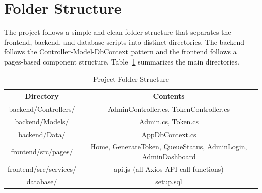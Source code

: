 \section{Folder Structure}

The project follows a simple and clean folder structure that separates the frontend, backend, and database scripts into distinct directories. The backend follows the Controller-Model-DbContext pattern and the frontend follows a pages-based component structure. Table~\ref{tab:folders} summarizes the main directories.

\begin{table}[htbp]
    \centering
    \begin{tabular}{|c|c|}
        \hline
        \textbf{Directory} & \textbf{Contents} \\
        \hline
        backend/Controllers/ & AdminController.cs, TokenController.cs \\
        \hline
        backend/Models/ & Admin.cs, Token.cs \\
        \hline
        backend/Data/ & AppDbContext.cs \\
        \hline
        frontend/src/pages/ & Home, GenerateToken, QueueStatus, AdminLogin, AdminDashboard \\
        \hline
        frontend/src/services/ & api.js (all Axios API call functions) \\
        \hline
        database/ & setup.sql \\
        \hline
    \end{tabular}
    \caption{Project Folder Structure}
    \label{tab:folders}
\end{table}
